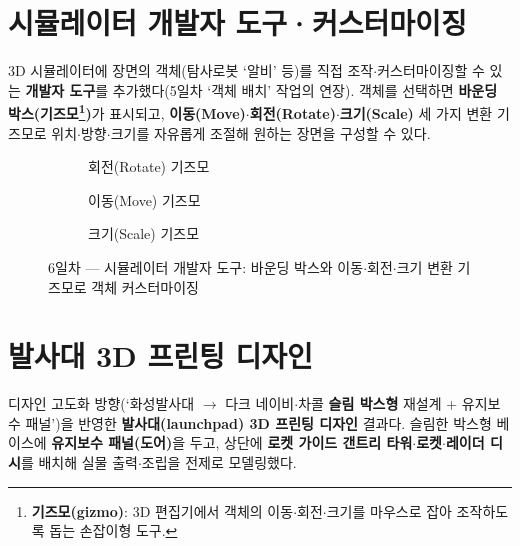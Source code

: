 \section{시뮬레이터 개발자 도구·커스터마이징}
3D 시뮬레이터에 장면의 객체(탐사로봇 ‘알비’ 등)를 직접 조작$\cdot$커스터마이징할 수 있는
\textbf{개발자 도구}를 추가했다(5일차 ‘객체 배치’ 작업의 연장). 객체를 선택하면 \textbf{바운딩
박스(기즈모\footnote{\textbf{기즈모(gizmo)}: 3D 편집기에서 객체의 이동$\cdot$회전$\cdot$크기를
마우스로 잡아 조작하도록 돕는 손잡이형 도구.})}가 표시되고, \textbf{이동(Move)$\cdot$회전(Rotate)$\cdot$크기(Scale)} 세 가지 변환
기즈모로 위치$\cdot$방향$\cdot$크기를 자유롭게 조절해 원하는 장면을 구성할 수 있다.

\smallskip
\noindent{}   %

\begin{figure}[htbp]\centering
  \begin{subfigure}{0.32\linewidth}\centering
    \caption{회전(Rotate) 기즈모}
  \end{subfigure}\hfill
  \begin{subfigure}{0.32\linewidth}\centering
    \caption{이동(Move) 기즈모}
  \end{subfigure}\hfill
  \begin{subfigure}{0.32\linewidth}\centering
    \caption{크기(Scale) 기즈모}
  \end{subfigure}
  \caption{6일차 — 시뮬레이터 개발자 도구: 바운딩 박스와 이동$\cdot$회전$\cdot$크기 변환 기즈모로 객체 커스터마이징}
\end{figure}

\section{발사대 3D 프린팅 디자인}
디자인 고도화 방향(‘화성발사대 $\to$ 다크 네이비$\cdot$차콜 \textbf{슬림 박스형} 재설계 + 유지보수
패널’)을 반영한 \textbf{발사대(launchpad) 3D 프린팅 디자인} 결과다. 슬림한 박스형 베이스에
\textbf{유지보수 패널(도어)}을 두고, 상단에 \textbf{로켓 가이드 갠트리 타워$\cdot$로켓$\cdot$레이더
디시}를 배치해 실물 출력$\cdot$조립을 전제로 모델링했다.

\smallskip
\noindent{}   

